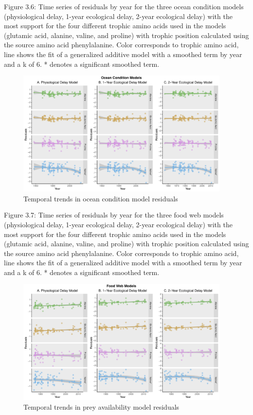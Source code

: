 \documentclass [11pt, proquest] {uwthesis}[2015/03/03]
\begin{document}
\begin{landscape}
Figure 3.6: Time series of residuals by year for the three ocean condition models (physiological delay, 1-year ecological delay, 2-year ecological delay) with the most support for the four different trophic amino acids used in the models (glutamic acid, alanine, valine, and proline) with trophic position calculated using the source amino acid phenylalanine. Color corresponds to trophic amino acid, line shows the fit of a generalized additive model with a smoothed term by year and a k of 6. * denotes a significant smoothed term.
\newline 
\begin{figure}[h]
\centering
  \includegraphics[width=0.95\textwidth]{figure/Ch3/FigureS7.pdf}
  \caption{Temporal trends in ocean condition model residuals}
  \label{fig:ocresid}
\end{figure}
\end{landscape}
\clearpage
\begin{landscape}
Figure 3.7: Time series of residuals by year for the three food web models (physiological delay, 1-year ecological delay, 2-year ecological delay) with the most support for the four different trophic amino acids used in the models (glutamic acid, alanine, valine, and proline) with trophic position calculated using the source amino acid phenylalanine. Color corresponds to trophic amino acid, line shows the fit of a generalized additive model with a smoothed term by year and a k of 6. * denotes a significant smoothed term.
\newline 
\begin{figure}[h]
\centering
  \includegraphics[width=0.95\textwidth]{figure/Ch3/FigureS8.pdf}
  \caption{Temporal trends in prey availability model residuals}
  \label{fig:prresid}
\end{figure}
\end{landscape}
\end{document}
